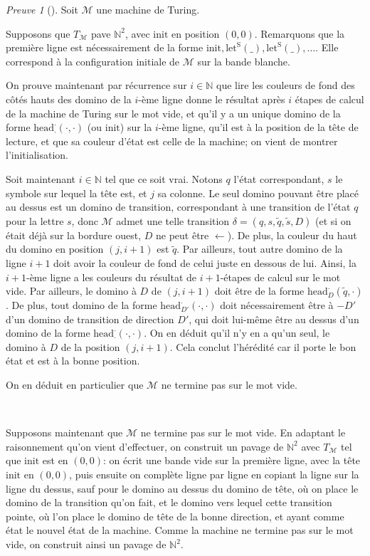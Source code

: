 \documentclass{scrartcl}
\newcommand{\N}{\mathbb N}
\theoremstyle{definition}
\theoremstyle{remark}
\newtheorem*{preuve}{Preuve}
\begin{document}
\begin{preuve}[]
  Soit $\mathcal M$ une machine de Turing.

  Supposons que $T_\mathcal M$ pave $\N^2$, avec $\mathrm{init}$ en position $(0,0)$. Remarquons que la première ligne est nécessairement de la forme $\mathrm{init},\mathrm{let}^\mathrm S(\_), \mathrm{let}^\mathrm S(\_),\ldots$. Elle correspond à la configuration initiale de $\mathcal M$ sur la bande blanche.

  On prouve maintenant par récurrence sur $i\in\N$ que lire les couleurs de fond des côtés hauts des domino de la $i$-ème ligne donne le résultat après $i$ étapes de calcul de la machine de Turing sur le mot vide, et qu'il y a un unique domino de la forme $\mathrm{head}_\cdot^\cdot(\cdot,\cdot)$ (ou $\mathrm{init}$) sur la $i$-ème ligne, qu'il est à la position de la tête de lecture, et que sa couleur d'état est celle de la machine; on vient de montrer l'initialisation.

  Soit maintenant $i\in\N$ tel que ce soit vrai. Notons $q$ l'état correspondant, $s$ le symbole sur lequel la tête est, et $j$ sa colonne. Le seul domino pouvant être placé au dessus est un domino de transition, correspondant à une transition de l'état $q$ pour la lettre $s$, donc $\mathcal M$ admet une telle transition $\delta=(q,s,\tilde q,\tilde s,D)$ (et si on était déjà sur la bordure ouest, $D$ ne peut être $\leftarrow$). De plus, la couleur du haut du domino en position $(j,i+1)$ est $\tilde q$. Par ailleurs, tout autre domino de la ligne $i+1$ doit avoir la couleur de fond de celui juste en dessous de lui. Ainsi, la $i+1$-ème ligne a les couleurs du résultat de $i+1$-étapes de calcul sur le mot vide. Par ailleurs, le domino à $D$ de $(j,i+1)$ doit être de la forme $\mathrm{head}_D^\cdot(\tilde q,\cdot)$. De plus, tout domino de la forme $\mathrm{head}_{D'}^\cdot(\cdot,\cdot)$ doit nécessairement être à $-D'$ d'un domino de transition de direction $D'$, qui doit lui-même être au dessus d'un domino de la forme $\mathrm{head}_{\cdot}^\cdot(\cdot,\cdot)$. On en déduit qu'il n'y en a qu'un seul, le domino à $D$ de la position $(j, i+1)$. Cela conclut l'hérédité car il porte le bon état et est à la bonne position.

  On en déduit en particulier que $\mathcal M$ ne termine pas sur le mot vide.

  \

  Supposons maintenant que $\mathcal M$ ne termine pas sur le mot vide. En adaptant le raisonnement qu'on vient d'effectuer, on construit un pavage de $\N^2$ avec $T_\mathcal M$ tel que $\mathrm{init}$ est en $(0,0)$: on écrit une bande vide sur la première ligne, avec la tête $\mathrm{init}$ en $(0,0)$, puis ensuite on complète ligne par ligne en copiant la ligne sur la ligne du dessus, sauf pour le domino au dessus du domino de tête, où on place le domino de la transition qu'on fait, et le domino vers lequel cette transition pointe, où l'on place le domino de tête de la bonne direction, et ayant comme état le nouvel état de la machine. Comme la machine ne termine pas sur le mot vide, on construit ainsi un pavage de $\N^2$.
  

\end{preuve}
\end{document}
